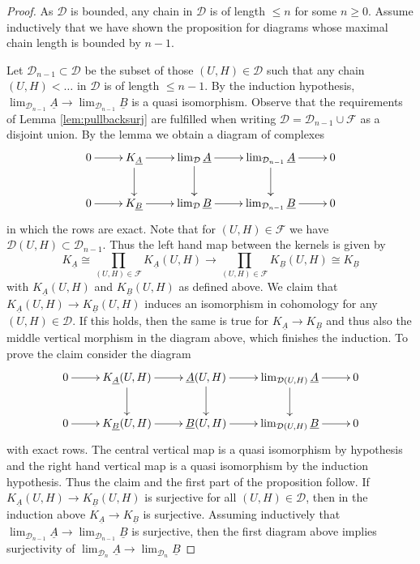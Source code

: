 \documentclass[12pt,a4paper]{article}
\theoremstyle{definition}
\begin{document}
\begin{proof}
As $\mathcal{D}$ is bounded, any chain in $\mathcal{D}$ is of length $\leq n$ for some $n\geq 0$. Assume inductively that we have shown the proposition for diagrams whose maximal chain length is bounded by $n-1$.

Let $\mathcal{D}_{n-1}\subset \mathcal{D}$ be the subset of those $(U,H)\in \mathcal{D}$ such that any chain $(U,H)<\ldots $ in $\mathcal{D}$ is of length $\leq n-1$. By the induction hypothesis, $\lim_{\mathcal{D}_{n-1}}\underline{A}\rightarrow \lim_{\mathcal{D}_{n-1}}\underline{B}$ is a quasi isomorphism.
Observe that the requirements of Lemma \ref{lem:pullbacksurj} are fulfilled when writing $\mathcal{D}=\mathcal{D}_{n-1}\cup\mathcal{F}$ as a disjoint union.
By the lemma we obtain a diagram of complexes
\[\xymatrix{
0\ar[r] & K_{\underline{A}} \ar[r]\ar[d]& \lim_{\mathcal{D}}\underline{A}\ar[r]\ar[d]&\lim_{\mathcal{D}_{n-1}}\underline{A}\ar[r]\ar[d]&0\\
0\ar[r]& K_{\underline{B}}\ar[r]&\lim_{\mathcal{D}}\underline{B}\ar[r]&\lim_{\mathcal{D}_{n-1}}\underline{B}\ar[r]& 0
}\]
in which the rows are exact. Note that for $(U,H)\in \mathcal{F}$ we have $\mathcal{D}(U,H)\subset \mathcal{D}_{n-1}$. Thus the left hand map between the kernels is given by \[K_{\underline{A}}\cong \prod_{(U,H)\in\mathcal{F}}K_{\underline{A}}(U,H)\rightarrow \prod_{(U,H)\in\mathcal{F}}K_{\underline{B}}(U,H)\cong K_{\underline{B}}\]
with $K_{\underline{A}}(U,H)$ and $K_{\underline{B}}(U,H)$ as defined above.
We claim that $K_{\underline{A}}(U,H)\rightarrow K_{\underline{B}}(U,H)$ induces an isomorphism in cohomology for any $(U,H)\in\mathcal{D}$. If this holds, then the same is true for $K_{\underline{A}}\rightarrow K_{\underline{B}}$ and thus also the middle vertical morphism in the diagram above, which finishes the induction. To prove the claim consider the diagram
\[\xymatrix{
0\ar[r] & K_{\underline{A}}(U,H) \ar[r]\ar[d]& \underline{A}(U,H)\ar[r]\ar[d]&\lim_{\mathcal{D}(U,H)}\underline{A}\ar[r]\ar[d]&0\\
0\ar[r]& K_{\underline{B}}(U,H)\ar[r]&\underline{B}(U,H)\ar[r]&\lim_{\mathcal{D}(U,H)}\underline{B}\ar[r]& 0
}\]
with exact rows. The central vertical map is a quasi isomorphism by hypothesis and the right hand vertical map is a quasi isomorphism by the induction hypothesis. Thus the claim and the first part of the proposition follow. If $K_{\underline{A}}(U,H)\rightarrow K_{\underline{B}}(U,H)$ is surjective for all $(U,H)\in \mathcal{D}$, then in the induction above $K_{\underline{A}}\rightarrow K_{\underline{B}}$ is surjective. Assuming inductively that $\lim_{\mathcal{D}_{n-1}}\underline{A}\rightarrow \lim_{\mathcal{D}_{n-1}}\underline{B}$ is surjective, then the first diagram above implies surjectivity of $\lim_{\mathcal{D}_{n}}\underline{A}\rightarrow \lim_{\mathcal{D}_{n}}\underline{B}$
\end{proof}
\end{document}
